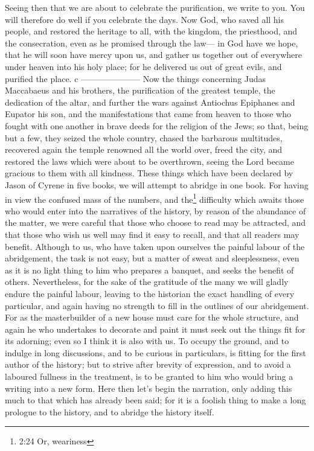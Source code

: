  Seeing then that we are about to celebrate the
purification, we write to you. You will therefore do well if you
celebrate the days.  Now God, who saved all his people, and
restored the heritage to all, with the kingdom, the priesthood, and the
consecration,  even as he promised through the law--- in
God have we hope, that he will soon have mercy upon us, and gather us
together out of everywhere under heaven into his holy place; for he
delivered us out of great evils, and purified the place. c
---------------------  Now the things concerning Judas
Maccabaeus and his brothers, the purification of the greatest temple,
the dedication of the altar,  and further the wars against
Antiochus Epiphanes and Eupator his son,  and the
manifestations that came from heaven to those who fought with one
another in brave deeds for the religion of the Jews; so that, being but
a few, they seized the whole country, chased the barbarous multitudes,
 recovered again the temple renowned all the world over,
freed the city, and restored the laws which were about to be overthrown,
seeing the Lord became gracious to them with all kindness. 
These things which have been declared by Jason of Cyrene in five books,
we will attempt to abridge in one book.  For having in view
the confused mass of the numbers, and the\footnote{2:24 Or, weariness}
difficulty which awaits those who would enter into the narratives of the
history, by reason of the abundance of the matter,  we were
careful that those who choose to read may be attracted, and that those
who wish us well may find it easy to recall, and that all readers may
benefit.  Although to us, who have taken upon ourselves the
painful labour of the abridgement, the task is not easy, but a matter of
sweat and sleeplessness,  even as it is no light thing to
him who prepares a banquet, and seeks the benefit of others.
Nevertheless, for the sake of the gratitude of the many we will gladly
endure the painful labour,  leaving to the historian the
exact handling of every particular, and again having no strength to fill
in the outlines of our abridgement.  For as the
masterbuilder of a new house must care for the whole structure, and
again he who undertakes to decorate and paint it must seek out the
things fit for its adorning; even so I think it is also with us.
 To occupy the ground, and to indulge in long discussions,
and to be curious in particulars, is fitting for the first author of the
history;  but to strive after brevity of expression, and to
avoid a laboured fullness in the treatment, is to be granted to him who
would bring a writing into a new form.  Here then let's
begin the narration, only adding this much to that which has already
been said; for it is a foolish thing to make a long prologue to the
history, and to abridge the history itself.

